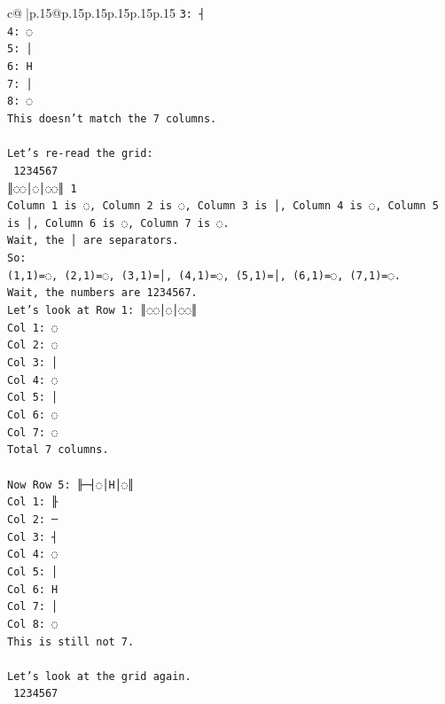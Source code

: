 \documentclass{article}
\begin{document}
{\begin{supertabular}{c@{$\;$}|p{.15\linewidth}@{}p{.15\linewidth}p{.15\linewidth}p{.15\linewidth}p{.15\linewidth}p{.15\linewidth}}
{{{\texttt{3: ┤} \\
\texttt{4: ◌} \\
\texttt{5: │} \\
\texttt{6: H} \\
\texttt{7: │} \\
\texttt{8: ◌} \\
\texttt{This doesn't match the 7 columns.} \\
\\ 
\texttt{Let's re{-}read the grid:} \\
\texttt{ 1234567} \\
\texttt{║◌◌│◌│◌◌║ 1} \\
\texttt{Column 1 is ◌, Column 2 is ◌, Column 3 is │, Column 4 is ◌, Column 5 is │, Column 6 is ◌, Column 7 is ◌.} \\
\texttt{Wait, the │ are separators.} \\
\texttt{So:} \\
\texttt{(1,1)=◌, (2,1)=◌, (3,1)=│, (4,1)=◌, (5,1)=│, (6,1)=◌, (7,1)=◌.} \\
\texttt{Wait, the numbers are 1234567.} \\
\texttt{Let's look at Row 1: ║◌◌│◌│◌◌║} \\
\texttt{Col 1: ◌} \\
\texttt{Col 2: ◌} \\
\texttt{Col 3: │} \\
\texttt{Col 4: ◌} \\
\texttt{Col 5: │} \\
\texttt{Col 6: ◌} \\
\texttt{Col 7: ◌} \\
\texttt{Total 7 columns.} \\
\\ 
\texttt{Now Row 5: ╟─┤◌│H│◌║} \\
\texttt{Col 1: ╟} \\
\texttt{Col 2: ─} \\
\texttt{Col 3: ┤} \\
\texttt{Col 4: ◌} \\
\texttt{Col 5: │} \\
\texttt{Col 6: H} \\
\texttt{Col 7: │} \\
\texttt{Col 8: ◌} \\
\texttt{This is still not 7.} \\
\\ 
\texttt{Let's look at the grid again.} \\
\texttt{ 1234567} \\
}}}
\end{supertabular}}
\end{document}
